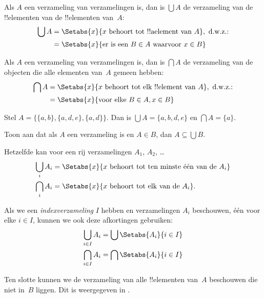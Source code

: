 \documentclass[../../../include/open-logic-section]{subfiles}
\begin{document}
\begin{defn}
Als $A$ een verzameling van verzamelingen is, dan is $\bigcup A$ de verzameling
van de !!{element}en van de !!{element}en van~$A$:
\begin{align*}
\bigcup A & = \Setabs{x}{x \text{ behoort tot !!a{element} van } A},
\text{ d.w.z.:}\\
& = \Setabs{x}{\text{er is een } B \in A
  \text{ waarvoor } x \in B}
\end{align*}
\end{defn}

\begin{defn}
Als $A$ een verzameling van verzamelingen is, dan is $\bigcap A$ de verzameling
van de objecten die alle elementen van~$A$ gemeen hebben:
\begin{align*}
\bigcap A & = \Setabs{x}{x \text{ behoort tot elk !!{element} van } A},
\text{ d.w.z.:}\\
 & = \Setabs{x}{\text{voor elke } B \in A, x \in B}
\end{align*}
\end{defn}

\begin{ex}
Stel $A = \{ \{ a, b \}, \{ a, d, e \}, \{ a, d \} \}$.
Dan is $\bigcup A = \{ a, b, d, e \}$ en $\bigcap A = \{ a \}$.
\end{ex}
\begin{prob}
	Toon aan dat als $A$ een verzameling is en $A \in B$, dan
	$A \subseteq \bigcup B$.
\end{prob}

Hetzelfde kan voor een rij verzamelingen $A_1$, $A_2$, \dots
\begin{align*}
\bigcup_i A_i & = \Setabs{x}{x \text{ behoort tot ten minste één van de } A_i}\\
\bigcap_i A_i & = \Setabs{x}{x \text{ behoort tot elk van de } A_i}.
\end{align*}

Als we een \emph{indexverzameling} $I$ hebben en verzamelingen $A_i$
beschouwen, één voor elke $i \in I$, kunnen we ook deze afkortingen gebruiken:
\begin{align*}
	\bigcup_{i \in I} A_i & = \bigcup \Setabs{A_i }{i \in I}\\
	\bigcap_{i \in I} A_i & = \bigcap\Setabs{A_i}{i \in I}
\end{align*}

Ten slotte kunnen we de verzameling van alle !!{element}en van~$A$ beschouwen
die niet in~$B$ liggen. Dit is weergegeven in .
\end{document}
